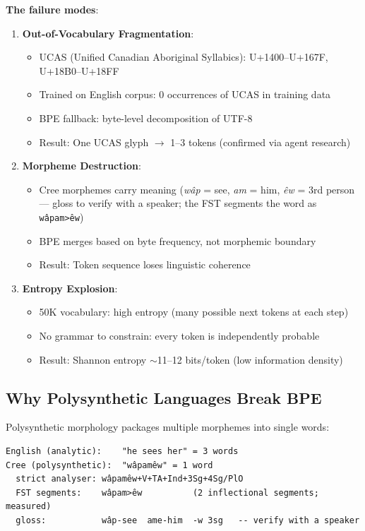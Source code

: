 \documentclass[11pt,oneside]{article}
\begin{document}
\textbf{The failure modes}:

\begin{enumerate}
  \item \textbf{Out-of-Vocabulary Fragmentation}:
  \begin{itemize}
    \item UCAS (Unified Canadian Aboriginal Syllabics): U+1400--U+167F, U+18B0--U+18FF
    \item Trained on English corpus: 0 occurrences of UCAS in training data
    \item BPE fallback: byte-level decomposition of UTF-8
    \item Result: One UCAS glyph $\to$ 1--3 tokens (confirmed via agent research)
  \end{itemize}

  \item \textbf{Morpheme Destruction}:
  \begin{itemize}
    \item Cree morphemes carry meaning (\emph{wâp} = see, \emph{am} = him, \emph{êw} = 3rd person --- gloss to verify with a speaker; the FST segments the word as \texttt{wâpam>êw})
    \item BPE merges based on byte frequency, not morphemic boundary
    \item Result: Token sequence loses linguistic coherence
  \end{itemize}

  \item \textbf{Entropy Explosion}:
  \begin{itemize}
    \item 50K vocabulary: high entropy (many possible next tokens at each step)
    \item No grammar to constrain: every token is independently probable
    \item Result: Shannon entropy $\sim$11--12 bits/token (low information density)
  \end{itemize}
\end{enumerate}

\subsection{Why Polysynthetic Languages Break BPE}

Polysynthetic morphology packages multiple morphemes into single words:

\begin{lstlisting}
English (analytic):    "he sees her" = 3 words
Cree (polysynthetic):  "wâpamêw" = 1 word
  strict analyser: wâpamêw+V+TA+Ind+3Sg+4Sg/PlO
  FST segments:    wâpam>êw          (2 inflectional segments; measured)
  gloss:           wâp-see  ame-him  -w 3sg   -- verify with a speaker
\end{lstlisting}
\end{document}
